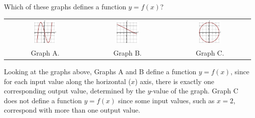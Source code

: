 \begin{example}
Which of these graphs defines a function $y=f(x)$?
\begin{table}[ht!]
\begin{centering}
\begin{tabular}{ccc}
\includegraphics[width=0.3\textwidth]{img/chap1/sec1-2/ex114a.png}
&
\includegraphics[width=0.3\textwidth]{img/chap1/sec1-2/ex114b.png}
&
\includegraphics[width=0.3\textwidth]{img/chap1/sec1-2/ex114c.png}\\
Graph A. & Graph B. & Graph C.\\
\end{tabular}
\end{centering}
\label{ex:1-2-graphs}
\end{table}

\solution Looking at the graphs above, Graphs A and B define a function
$y=f(x)$, since for each input value along the horizontal ($x$) axis,
there is exactly one corresponding output value, determined by the
$y$-value of the graph. Graph C does not
define a function $y=f(x)$ since some input values, such as
$x=2$, correspond with more than one output value.
\end{example}

